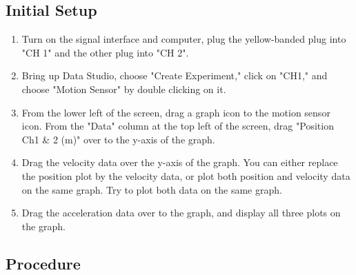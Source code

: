 \documentclass{article}
\begin{document}
\subsection*{Initial Setup}
\begin{enumerate}
\item Turn on the signal interface and computer, plug the yellow-banded plug into "CH 1" and the other plug into "CH 2".

\item Bring up Data Studio, choose "Create Experiment," click on "CH1," and choose "Motion Sensor" by double clicking on it.

\item From the lower left of the screen, drag a graph icon to the motion sensor icon. From the "Data" column at the top left of the screen, drag "Position Ch1 \& 2 (m)" over to the y-axis of the graph.


\item Drag the velocity data over the y-axis of the graph. You can either replace the position plot by the velocity data, or plot both position and velocity data on the same graph. Try to plot both data on the same graph.

\item Drag the acceleration data over to the graph, and display all three plots on the graph.



\end{enumerate}

\subsection*{Procedure}
\end{document}
